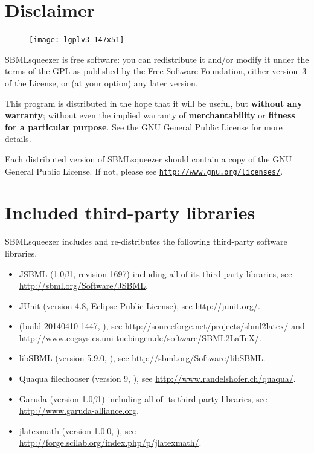 \section{Disclaimer}
\begin{figure}
\vspace{\wrapfigspace}
\texttt{[image: lgplv3-147x51]}
\end{figure}
SBMLsqueezer is free software: you can redistribute it and/or modify
it under the terms of the \acf{GPL} as published by
the Free Software Foundation, either version~3 of the License, or
(at your option) any later version.

This program is distributed in the hope that it will be useful,
but \textbf{without any warranty}; without even the implied warranty of
\textbf{merchantability} or \textbf{fitness for a particular purpose}. See the
GNU General Public License for more details.

Each distributed version of SBMLsqueezer should contain a copy of the 
GNU General Public License. If not, please see
\href{http://www.gnu.org/licenses/gpl-3.0-standalone.html}{\nolinkurl{http://www.gnu.org/licenses/}}.


\section{Included third-party libraries}
SBMLsqueezer includes and re-distributes the following third-party software libraries.
\begin{itemize}
  \item JSBML (1.0$\beta$1, revision 1697) including all of its third-party libraries, see \url{http://sbml.org/Software/JSBML}.
  \item JUnit (version 4.8, Eclipse Public License), see \url{http://junit.org/}.
  \item \SBMLLaTeX (build 20140410-1447, \GPL), see \url{http://sourceforge.net/projects/sbml2latex/} and \url{http://www.cogsys.cs.uni-tuebingen.de/software/SBML2LaTeX/}.
  \item libSBML (version 5.9.0, \LGPL), see \url{http://sbml.org/Software/libSBML}.
  \item Quaqua filechooser (version 9, \LGPL), see \url{http://www.randelshofer.ch/quaqua/}.
  \item Garuda (version 1.0$\beta$1) including all of its third-party libraries, see \url{http://www.garuda-alliance.org}.
  \item jlatexmath (version 1.0.0, \GPL), see \url{http://forge.scilab.org/index.php/p/jlatexmath/}.
\end{itemize}

